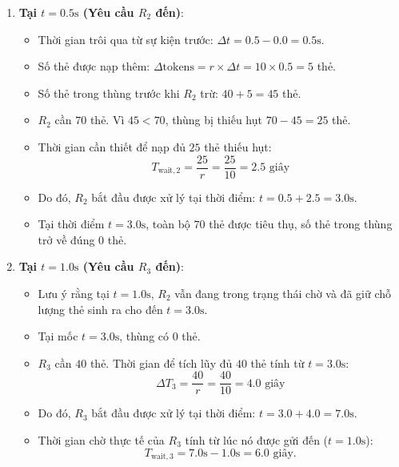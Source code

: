 \begin{example}
\begin{enumerate}
  \item \textbf{Tại $t = 0.5\text{s}$ (Yêu cầu $R_2$ đến)}:
    \begin{itemize}
      \item Thời gian trôi qua từ sự kiện trước: $\Delta t = 0.5 - 0.0 = 0.5\text{s}$.
      \item Số thẻ được nạp thêm: $\Delta \text{tokens} = r \times \Delta t = 10 \times 0.5 = 5$ thẻ.
      \item Số thẻ trong thùng trước khi $R_2$ trừ: $40 + 5 = 45$ thẻ.
      \item $R_2$ cần $70$ thẻ. Vì $45 < 70$, thùng bị thiếu hụt $70 - 45 = 25$ thẻ.
      \item Thời gian cần thiết để nạp đủ $25$ thẻ thiếu hụt:
      \begin{equation*}
      T_{\text{wait}, 2} = \frac{25}{r} = \frac{25}{10} = 2.5\text{ giây}
      \end{equation*}
      \item Do đó, $R_2$ bắt đầu được xử lý tại thời điểm: $t = 0.5 + 2.5 = 3.0\text{s}$.
      \item Tại thời điểm $t = 3.0\text{s}$, toàn bộ $70$ thẻ được tiêu thụ, số thẻ trong thùng trở về đúng $0$ thẻ.
    \end{itemize}

  \item \textbf{Tại $t = 1.0\text{s}$ (Yêu cầu $R_3$ đến)}:
    \begin{itemize}
      \item Lưu ý rằng tại $t = 1.0\text{s}$, $R_2$ vẫn đang trong trạng thái chờ và đã giữ chỗ lượng thẻ sinh ra cho đến $t = 3.0\text{s}$.
      \item Tại mốc $t = 3.0\text{s}$, thùng có $0$ thẻ.
      \item $R_3$ cần $40$ thẻ. Thời gian để tích lũy đủ $40$ thẻ tính từ $t = 3.0\text{s}$:
      \begin{equation*}
      \Delta T_3 = \frac{40}{r} = \frac{40}{10} = 4.0\text{ giây}
      \end{equation*}
      \item Do đó, $R_3$ bắt đầu được xử lý tại thời điểm: $t = 3.0 + 4.0 = 7.0\text{s}$.
      \item Thời gian chờ thực tế của $R_3$ tính từ lúc nó được gửi đến ($t = 1.0\text{s}$):
      \begin{equation*}
      T_{\text{wait}, 3} = 7.0\text{s} - 1.0\text{s} = 6.0\text{ giây}.
      \end{equation*}
    \end{itemize}
\end{enumerate}
\end{example}

